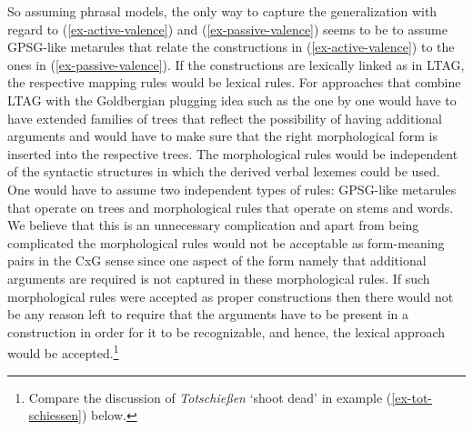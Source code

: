 \begin{exe}
\begin{xlist}[iv.]
\begin{exe}
\begin{xlist}[iv.]
So assuming phrasal models, the only way to capture the generalization with regard to (\ref{ex-active-valence}) and
(\ref{ex-passive-valence}) seems to be to assume GPSG-like metarules that relate the constructions
in (\ref{ex-active-valence}) to the ones in (\ref{ex-passive-valence}). If the constructions are
lexically linked as in LTAG, the respective mapping rules would be lexical rules. For approaches
that combine LTAG with the Goldbergian plugging idea such as the one by \citet{KO2012a} one would have to
have extended families of trees that reflect the possibility of having additional arguments and
would have to make sure that the right morphological form is inserted into the respective trees. The
morphological rules would be independent of the syntactic structures in which the derived verbal
lexemes could be used. One would have to assume two independent types of rules: GPSG-like metarules
that operate on trees and morphological rules that operate on stems and words. We believe that this
is an unnecessary complication and apart from being complicated the morphological rules would not
be acceptable as form-meaning pairs in the CxG sense since one aspect of the form namely that additional
arguments are required is not captured in these morphological rules. If such morphological rules
were accepted as proper constructions then there would not be any reason left to require that the
arguments have to be present in a construction in order for it to be recognizable, and hence, the
lexical approach would be accepted.\footnote{%
Compare the discussion of \emph{Totschießen} `shoot dead' in
example (\ref{ex-tot-schiessen}) below.%
}


\end{xlist}
\end{exe}
\end{xlist}
\end{exe}
